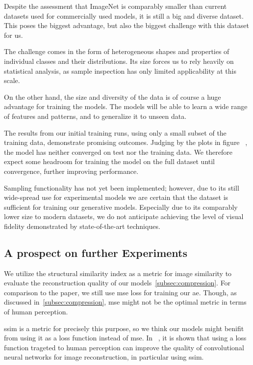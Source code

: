 Despite the assessment that ImageNet is comparably smaller than current datasets used for commercially used models, it is
still a big and diverse dataset.
This poses the biggest advantage, but also the biggest challenge with this dataset for us.

The challenge comes in the form of heterogeneous shapes and properties of individual classes and their distributions.
Its size forces us to rely heavily on statistical analysis, as sample inspection has only limited applicability at
this scale.

On the other hand, the size and diversity of the data is of course a huge advantage for training the models.
The models will be able to learn a wide range of features and patterns, and to generalize it to unseen data.

The results from our initial training runs, using only a small subset of the training data, demonstrate promising
outcomes.
Judging by the plots in figure ~\cite{citationNeeded}, the model has neither converged on test nor the training data.
We therefore expect some headroom for training the model on the full dataset until convergence, further improving
performance.

Sampling functionality has not yet been implemented; however, due to its still wide-spread use for experimental
models we are certain that the dataset is sufficient for training our generative models.
Especially due to its comparably lower size to modern datasets, we do not anticipate achieving the level of visual
fidelity demonstrated by state-of-the-art techniques.

\subsection{A prospect on further Experiments}\label{subsec:further-ideas}
We utilize the structural similarity index as a metric for image similarity to evaluate the reconstruction quality
of our models~\ref{subsec:compression}.
For comparison to the paper, we still use \ac{mse} loss for training our \ac{ae}.
Though, as discussed in~\ref{subsec:compression}, \ac{mse} might not be the optimal metric in terms of human perception.

\ac{ssim} is a metric for precisely this purpose, so we think our models might benifit from using it as a loss
function instead of \ac{mse}.
In ~\cite{ssim_as_loss}, it is shown that using a loss function trageted to human perception can improve the quality
of convolutional neural networks for image reconstruction, in particular using \ac{ssim}.

